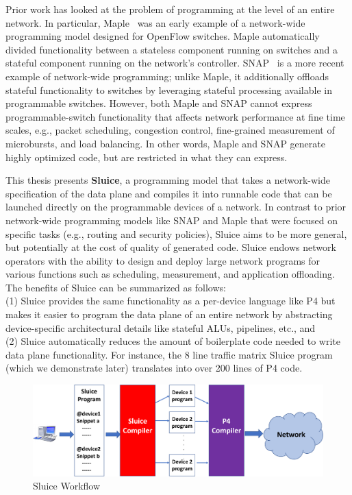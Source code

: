 \documentclass[12pt, oneside]{article}
\begin{document}
Prior work has looked at the problem of programming at the level of an entire
network. In particular, Maple~\cite{maple} was an early example of a
network-wide programming model designed for OpenFlow switches. Maple
automatically divided functionality between a stateless component running on
switches and a stateful component running on the network's controller.
SNAP~\cite{snap} is a more recent example of network-wide programming; unlike
Maple, it additionally offloads stateful functionality to switches by
leveraging stateful processing available in programmable switches.  However,
both Maple and SNAP cannot express programmable-switch functionality that
affects network performance at fine time scales, e.g., packet scheduling,
congestion control, fine-grained measurement of microbursts, and load
balancing. In other words, Maple and SNAP generate highly optimized code, but
are restricted in what they can express.

This thesis presents \textbf{Sluice}, a programming model that takes a
network-wide specification of the data plane and compiles it into runnable code
that can be launched directly on the programmable devices of a network. In
contrast to prior network-wide programming models like SNAP and Maple that were
focused on specific tasks (e.g., routing and security policies), Sluice aims to
be more general, but potentially at the cost of quality of generated code.
Sluice endows network operators with the ability to design and deploy large
network programs for various functions such as scheduling, measurement, and
application offloading.  The benefits of Sluice can be summarized as follows:\\
\quad  (1) Sluice provides the same functionality as a per-device language like P4 but makes it easier to program the data plane of an entire network by abstracting device-specific architectural details like stateful ALUs, pipelines, etc., and\\
\quad  (2) Sluice automatically reduces the amount of boilerplate code needed to write data plane functionality. For instance, the 8 line traffic matrix Sluice program (which we demonstrate later) translates into over 200 lines of P4 code. 

\begin{figure}
\centering
\includegraphics[width=140mm,scale=0.7]{figures/sluice_workflow.pdf}
\caption{Sluice Workflow}\label{fig1}
\end{figure}
\end{document}
